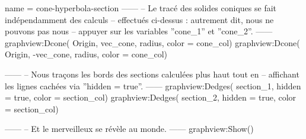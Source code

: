 \documentclass[border = 3pt]{standalone}
\begin{document}
\begin{luadraw}{name = cone-hyperbola-section}
------
-- Le tracé des solides coniques se fait indépendamment des calculs
-- effectués ci-dessus : autrement dit, nous ne pouvons pas nous
-- appuyer sur les variables ''cone_1'' et ''cone_2''.
------
    graphview:Dcone(
        Origin, vec_cone, radius,
        {color = cone_col})
    graphview:Dcone(
        Origin, -vec_cone, radius,
        {color = cone_col})

------
-- Nous traçons les bords des sections calculées plus haut tout en
-- affichant les lignes cachées via ''hidden = true''.
------
    graphview:Dedges(
        section_1,
        {hidden = true, color = section_col})
    graphview:Dedges(
        section_2,
        {hidden = true, color = section_col})

------
-- Et le merveilleux se révèle au monde.
------
    graphview:Show()
\end{luadraw}
\end{document}
